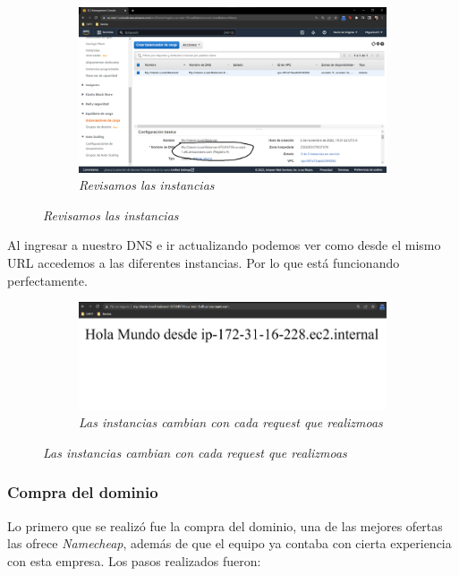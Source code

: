 \begin{figure}[H]
    \centering
    \begin{subfigure}[b]{0.8\textwidth}
        \centering
        \includegraphics[width=\textwidth]{Figures/0. General/load_balancer_10.png}
        \caption{\textit{Revisamos las instancias}}
        \label{fig: load balancer 10}
    \end{subfigure}
\end{figure}

Al ingresar a nuestro DNS e ir actualizando podemos ver como desde el mismo URL
accedemos a las diferentes instancias. Por lo que está funcionando perfectamente.

\begin{figure}[H]
    \centering
    \begin{subfigure}[b]{0.8\textwidth}
        \centering
        \includegraphics[width=\textwidth]{Figures/0. General/load_balancer_11.png}
        \caption{\textit{Las instancias cambian con cada request que realizmoas}}
        \label{fig: load balancer 11}
    \end{subfigure}
\end{figure}

\subsubsection{Compra del dominio}
Lo primero que se realizó fue la compra del dominio, una de las mejores ofertas
las ofrece \textit{Namecheap}, además de que el equipo ya contaba con cierta
experiencia con esta empresa. Los pasos realizados fueron:

